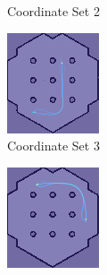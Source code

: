 \documentclass[%
paper=A4,               %
twoside=true,           %
openright,              %
11pt,                   %
bibliography=totoc,     %
titlepage=on,           %
DIV=12,                 %
BCOR=1.5cm,             %
parskip=half,            %
final
]{scrreprt}
\begin{document}
\begin{figure}[H]
\begin{subfigure}[b]{0.45\textwidth}
			\caption{Coordinate Set 2}
			\label{fig:fig11}
		\end{subfigure}
		\vfill
		\begin{subfigure}[b]{0.45\textwidth}
			\centering
			\includegraphics[width=\textwidth]{Graphics/heatmapsim3.png}
			\caption{Coordinate Set 3}
			\label{fig:fig12}
		\end{subfigure}
		\hfill
		\begin{subfigure}[b]{0.45\textwidth}
			\centering
			\includegraphics[width=\textwidth]{Graphics/heatmapsim4.png}

\end{subfigure}
\end{figure}
\end{document}
